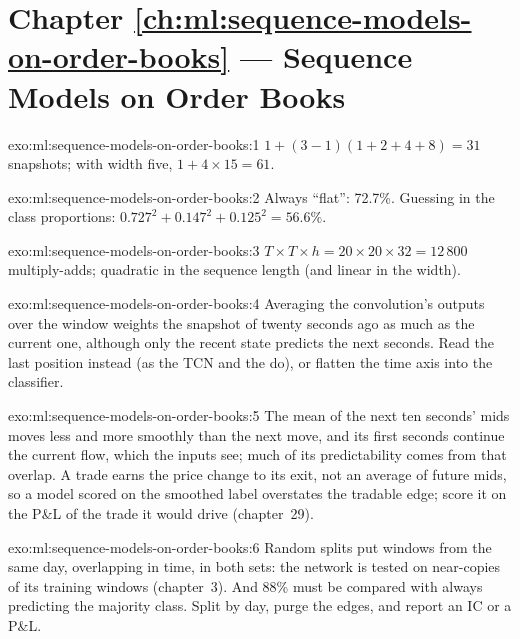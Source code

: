 \section*{Chapter \ref{ch:ml:sequence-models-on-order-books} --- Sequence Models on Order Books}

\begin{solution}{exo:ml:sequence-models-on-order-books:1}
$1 + (3 - 1)(1 + 2 + 4 + 8) = 31$ snapshots; with width five, $1 + 4\times15 = 61$.
\end{solution}

\begin{solution}{exo:ml:sequence-models-on-order-books:2}
Always ``flat'': 72.7\%. Guessing in the class proportions: $0.727^2 + 0.147^2 + 0.125^2 = 56.6\%$.
\end{solution}

\begin{solution}{exo:ml:sequence-models-on-order-books:3}
$T\times T\times h = 20\times20\times32 = 12\,800$ multiply-adds; quadratic in the sequence length (and linear in the
width).
\end{solution}

\begin{solution}{exo:ml:sequence-models-on-order-books:4}
Averaging the convolution's outputs over the window weights the snapshot of twenty seconds ago as much as the current one,
although only the recent state predicts the next seconds. Read the last position instead (as the TCN and the 
do), or flatten the time axis into the classifier.
\end{solution}

\begin{solution}{exo:ml:sequence-models-on-order-books:5}
The mean of the next ten seconds' mids moves less and more smoothly than the next move, and its first seconds continue the
current flow, which the inputs see; much of its predictability comes from that overlap. A trade earns the price change to
its exit, not an average of future mids, so a model scored on the smoothed label overstates the tradable edge; score it
on the P\&L of the trade it would drive (chapter~29).
\end{solution}

\begin{solution}{exo:ml:sequence-models-on-order-books:6}
Random splits put windows from the same day, overlapping in time, in both sets: the network is tested on near-copies of
its training windows (chapter~3). And 88\% must be compared with always predicting the majority class. Split by day,
purge the edges, and report an IC or a P\&L.
\end{solution}

